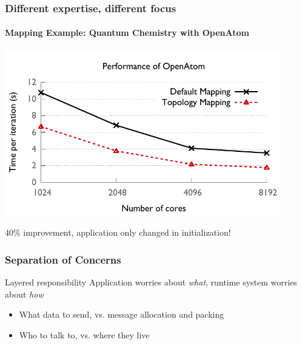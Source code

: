 \begin{frame}
\frametitle{Different expertise, different focus}
\framesubtitle{Mapping Example: Quantum Chemistry with {\sc OpenAtom}}
\includegraphics[width=0.9\textwidth]{../figures/openatom/map.pdf}
\begin{block}{40\% improvement, application only changed in initialization!}\end{block}
\end{frame}


\begin{frame}
\frametitle{Separation of Concerns}
\begin{block}{Layered responsibility}
Application worries about \emph{what}, runtime system worries about \emph{how}
\end{block}
\begin{itemize}
\item What data to send, vs. message allocation and packing
\item Who to talk to, vs. where they live
\end{itemize}
\end{frame}
